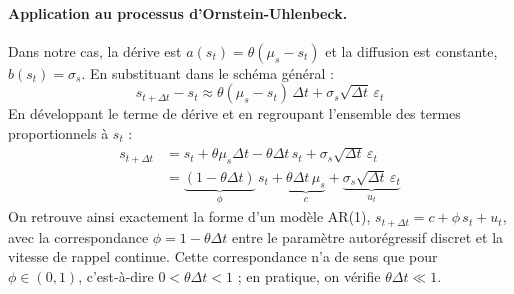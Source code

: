 \documentclass{article}
\begin{document}
\paragraph{Application au processus d'Ornstein-Uhlenbeck.} Dans notre cas, la dérive est $a(s_t) = \theta(\mu_s - s_t)$ et la diffusion est constante, $b(s_t) = \sigma_s$. En substituant dans le schéma général :
\begin{equation}
s_{t+\Delta t} - s_t \approx \theta(\mu_s - s_t)\,\Delta t + \sigma_s \sqrt{\Delta t}\,\varepsilon_t
\end{equation}
En développant le terme de dérive et en regroupant l'ensemble des termes proportionnels à $s_t$ :
\begin{align}
s_{t+\Delta t} &= s_t + \theta \mu_s \Delta t - \theta \Delta t\, s_t + \sigma_s \sqrt{\Delta t}\,\varepsilon_t \\
&= \underbrace{(1 - \theta \Delta t)}_{\phi}\, s_t + \underbrace{\theta \Delta t\, \mu_s}_{c} + \underbrace{\sigma_s \sqrt{\Delta t}\,\varepsilon_t}_{u_t}
\end{align}
On retrouve ainsi exactement la forme d'un modèle AR(1), $s_{t+\Delta t} = c + \phi\, s_t + u_t$, avec la correspondance $\phi = 1 - \theta \Delta t$ entre le paramètre autorégressif discret et la vitesse de rappel continue. Cette correspondance n'a de sens que pour $\phi\in(0,1)$, c'est-à-dire $0<\theta\Delta t<1$ ; en pratique, on vérifie $\theta\Delta t\ll 1$.
\end{document}
